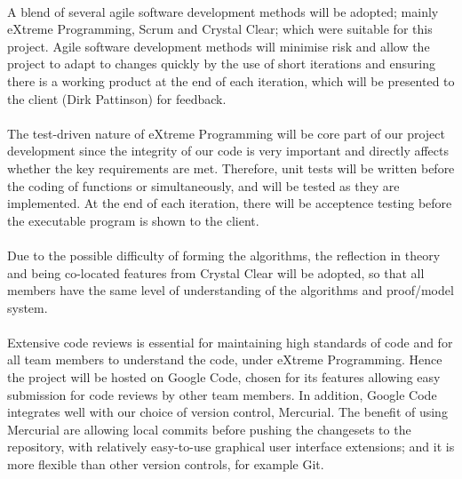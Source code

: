 \paragraph{}
A blend of several agile software development methods will be adopted; mainly eXtreme Programming, Scrum and Crystal Clear; which were suitable for this project. Agile software development methods will minimise risk and allow the project to adapt to changes quickly by the use of short iterations and ensuring there is a working product at the end of each iteration, which will be presented to the client (Dirk Pattinson) for feedback.

\paragraph{}
The test-driven nature of eXtreme Programming will be core part of our project development since the integrity of our code is very important and directly affects whether the key requirements are met. Therefore, unit tests will be written before the coding of functions or simultaneously, and will be tested as they are implemented. At the end of each iteration, there will be acceptence testing before the executable program is shown to the client.

\paragraph{}
Due to the possible difficulty of forming the algorithms, the reflection in theory and being co-located features from Crystal Clear will be adopted, so that all members have the same level of understanding of the algorithms and proof/model system.

\paragraph{}
Extensive code reviews is essential for maintaining high standards of code and for all team members to understand the code, under eXtreme Programming. Hence the project will be hosted on Google Code, chosen for its features allowing easy submission for code reviews by other team members. In addition, Google Code integrates well with our choice of version control, Mercurial. The benefit of using Mercurial are allowing local commits before pushing the changesets to the repository, with relatively easy-to-use graphical user interface extensions; and it is more flexible than other version controls, for example Git.

